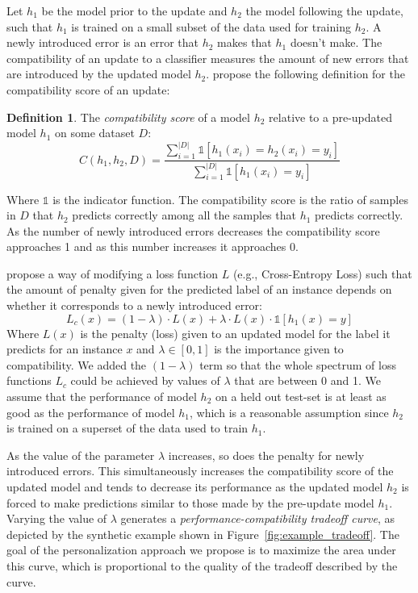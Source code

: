 \documentclass[letterpaper]{article} %
\theoremstyle{definition}
\newtheorem{definition}{Definition}
\begin{document}
Let $h_1$ be the model prior to the update and $h_2$ the model following the update, such that $h_1$ is trained on a small subset of the data used for training $h_2$. A newly introduced error is an error that $h_2$ makes that $h_1$ doesn't make.
The compatibility of an update to a classifier measures the amount of new errors that are introduced by the updated model  $h_2$.
\citet{bansal2019updates} propose the following definition for the compatibility score of an update:
\begin{definition}{The \textit{compatibility score} of a model $h_2$ relative to a pre-updated  model $h_1$ on some dataset $D$:}
\begin{equation}
\label{eq:compatibility}
C(h_1,h_2,D)=\frac{\sum_{i=1}^{|D|}\mathbb{1}[h_1(x_i)=h_2(x_i)=y_i]}{\sum_{i=1}^{|D|}\mathbb{1}[h_1(x_i)=y_i]}
\end{equation}
\end{definition}
\noindent Where $\mathbb{1}$ is the indicator function. The compatibility score is the ratio of samples in $D$ that $h_2$ predicts correctly among all the samples that $h_1$ predicts correctly. As the number of  newly introduced errors decreases the compatibility score approaches 1 and as this number increases it approaches 0.

\citet{bansal2019updates} propose a way of modifying a loss function $L$ (e.g., Cross-Entropy Loss) such that the amount of penalty given for the predicted label of an instance depends on whether it corresponds to a newly introduced error:
\begin{equation}
\label{eqn:non-personalized_loss}
L_c(x)=(1 - \lambda) \cdot
L(x)+\lambda\cdot
L(x)\cdot\mathbb{1}[h_1(x)=y]
\end{equation}
Where $L(x)$ is the penalty (loss) given to an updated model for the label it predicts for an instance $x$ and $\lambda\in [0,1]$ is the importance given to compatibility. We added the $(1-\lambda)$ term so that the whole spectrum of loss functions $L_c$ could be achieved by values of $\lambda$ that are between 0 and 1. We assume that the performance of  model $h_2$  on a held out test-set is at least as good as the performance of model $h_1$, which is a reasonable assumption since $h_2$ is trained on a superset of the data used to train $h_1$.

As the value of the parameter $\lambda$ increases, so does the  penalty for newly introduced errors. This simultaneously increases the compatibility score of the updated model and tends to decrease its performance as the updated model $h_2$ is forced to make predictions similar to those made by the pre-update model $h_1$. Varying the value of $\lambda$ generates a \emph{performance-compatibility tradeoff curve}, as depicted by the synthetic example shown in Figure~\ref{fig:example_tradeoff}.  The goal of the personalization approach we propose is to maximize the area under this curve, which is proportional to the quality of the tradeoff described by the curve.
\end{document}
